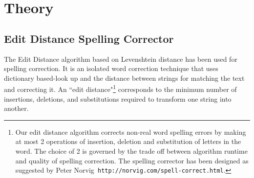 \documentclass[preprint,11pt]{elsarticle}
\begin{document}
\section{Theory}
\label{spell:algo}
%
%
%

\subsection{ Edit Distance Spelling Corrector}
\label{spell:algorithm}
The Edit Distance algorithm based on Levenshtein distance\cite{levenshtein1966binary} has been used for spelling correction. It is an isolated word correction technique that uses dictionary based-look up and the distance between strings for matching the text and correcting it. An ``edit distance"\footnote{Our edit distance algorithm corrects non-real word spelling errors by making at most 2 operations of insertion, deletion and substitution of letters in the word. The choice of 2 is governed by the trade off between algorithm runtime and quality of spelling correction. The spelling corrector has been designed as suggested by Peter Norvig\texttt{ http://norvig.com/spell-correct.html}.} corresponds to the minimum number of insertions, deletions, and substitutions required to transform one string into another. %
\end{document}
